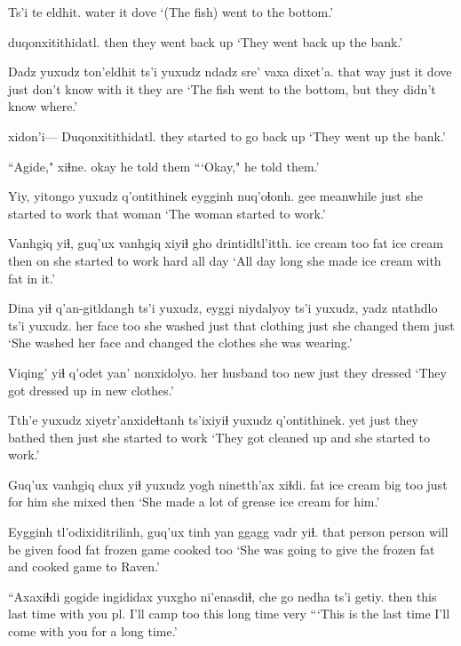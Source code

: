 \documentclass[12pt]{article}
\begin{document}
\gll Ts'i te eldhit.
{} water {it dove}
\glt `(The fish) went to the bottom.'
\glend

 duqonxitithidatl.
then {they went back up}
\glt `They went back up the bank.'
\glend

\gll Dadz yuxudz ton'eldhit ts'i yuxudz {ndadz sre'} vaxa dixet'a.
{that way} just {it dove} {} just {don't know}  {with it} {they are}
\glt `The fish went to the bottom, but they didn't know where.'
\glend

\gll xidon'i--- Duqonxitithidatl.
{} {they started to go back up}
\glt `They went up the bank.'
\glend

\gll ``Agide," xiɬne.
okay {he told them}
\glt ```Okay," he told them.'
\glend

\gll Yiy, yitongo yuxudz q'ontithinek eygginh nuq'oɬonh.
gee  meanwhile just {she started to work} that woman
\glt `The woman started to work.'
\glend

\gll Vanhgiq yiɬ, guq'ux vanhgiq xiyiɬ gho drintidltl'itth.
{ice cream} too fat {ice cream} then on {she started to work hard all day}
\glt `All day long she made ice cream with fat in it.'
\glend

\gll Dina yiɬ q'an-gitldangh ts'i yuxudz, eyggi niydalyoy ts'i yuxudz, {yadz ntathdlo} ts'i yuxudz.
{her face} too {she washed} {} just that clothing {} just {she changed them} {} just 
\glt `She washed her face and changed the clothes she was wearing.'
\glend

\gll Viqing' yiɬ q'odet yan' nonxidolyo.
{her husband} too new just {they dressed}
\glt `They got dressed up in new clothes.'
\glend

\gll Tth'e yuxudz xiyetr'anxideɬtanh ts'ixiyiɬ yuxudz q'ontithinek.
yet just {they bathed} then just {she started to work}
\glt `They got cleaned up and she started to work.'
\glend

\gll Guq'ux vanhgiq chux yiɬ yuxudz yogh ninetth'ax xiɬdi.
fat {ice cream} big too just {for him} {she mixed} then
\glt `She made a lot of grease ice cream for him.'
\glend

\gll Eygginh tl'odixiditrilinh, guq'ux {tinh yan} ggagg vadr yiɬ.
{that person} {person will be given food} fat frozen game cooked too
\glt `She was going to give the frozen fat and cooked game to Raven.'
\glend

\gll ``Axaxiɬdi gogide ingididax yuxgho ni'enasdiɬ, che go {nedha ts'i} getiy.
then this {last time} {with you pl.} {I'll camp} too this {long time} very
\glt ```This is the last time I'll come with you for a long time.'
\glend
\end{document}
